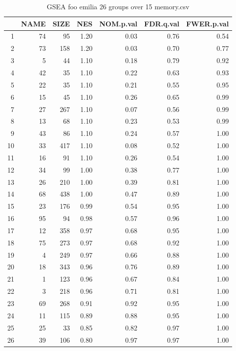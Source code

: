 \begin{table}[ht]
\centering
\begin{tabular}{rrrrrrr}
  \hline
 & NAME & SIZE & NES & NOM.p.val & FDR.q.val & FWER.p.val \\ 
  \hline
1 &  74 &  95 & 1.20 & 0.03 & 0.76 & 0.54 \\ 
  2 &  73 & 158 & 1.20 & 0.03 & 0.70 & 0.77 \\ 
  3 &   5 &  44 & 1.10 & 0.18 & 0.79 & 0.92 \\ 
  4 &  42 &  35 & 1.10 & 0.22 & 0.63 & 0.93 \\ 
  5 &  22 &  35 & 1.10 & 0.21 & 0.55 & 0.95 \\ 
  6 &  15 &  45 & 1.10 & 0.26 & 0.65 & 0.99 \\ 
  7 &  27 & 267 & 1.10 & 0.07 & 0.56 & 0.99 \\ 
  8 &  13 &  68 & 1.10 & 0.23 & 0.53 & 0.99 \\ 
  9 &  43 &  86 & 1.10 & 0.24 & 0.57 & 1.00 \\ 
  10 &  33 & 417 & 1.10 & 0.08 & 0.52 & 1.00 \\ 
  11 &  16 &  91 & 1.10 & 0.26 & 0.54 & 1.00 \\ 
  12 &  34 &  99 & 1.00 & 0.38 & 0.77 & 1.00 \\ 
  13 &  26 & 210 & 1.00 & 0.39 & 0.81 & 1.00 \\ 
  14 &  68 & 438 & 1.00 & 0.47 & 0.89 & 1.00 \\ 
  15 &  23 & 176 & 0.99 & 0.54 & 0.95 & 1.00 \\ 
  16 &  95 &  94 & 0.98 & 0.57 & 0.96 & 1.00 \\ 
  17 &  12 & 358 & 0.97 & 0.68 & 0.95 & 1.00 \\ 
  18 &  75 & 273 & 0.97 & 0.68 & 0.92 & 1.00 \\ 
  19 &   4 & 249 & 0.97 & 0.66 & 0.88 & 1.00 \\ 
  20 &  18 & 343 & 0.96 & 0.76 & 0.89 & 1.00 \\ 
  21 &   1 & 123 & 0.96 & 0.67 & 0.84 & 1.00 \\ 
  22 &   3 & 218 & 0.96 & 0.71 & 0.81 & 1.00 \\ 
  23 &  69 & 268 & 0.91 & 0.92 & 0.95 & 1.00 \\ 
  24 &  11 & 115 & 0.89 & 0.88 & 0.95 & 1.00 \\ 
  25 &  25 &  33 & 0.85 & 0.82 & 0.97 & 1.00 \\ 
  26 &  39 & 106 & 0.80 & 0.97 & 0.97 & 1.00 \\ 
   \hline
\end{tabular}
\caption{GSEA foo emilia 26 groups over 15 memory.csv} 
\label{Table:GSEA foo emilia 26 groups over 15 memory.csv}
\end{table}

